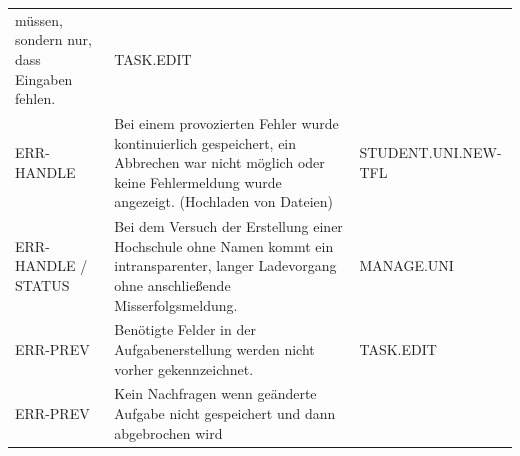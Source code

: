 \documentclass[
  12pt,
  ngerman,
  a4paper,
]{article}
\begin{document}
\begin{longtable}[]{@{}lll@{}}
\begin{minipage}[t]{0.52\columnwidth}
müssen, sondern nur, dass Eingaben fehlen.\strut
\end{minipage} & \begin{minipage}[t]{0.17\columnwidth}\raggedright
TASK.EDIT\strut
\end{minipage}\tabularnewline
\begin{minipage}[t]{0.22\columnwidth}\raggedright
ERR-HANDLE\strut
\end{minipage} & \begin{minipage}[t]{0.52\columnwidth}\raggedright
Bei einem provozierten Fehler wurde kontinuierlich gespeichert, ein
Abbrechen war nicht möglich oder keine Fehlermeldung wurde angezeigt.
(Hochladen von Dateien)\strut
\end{minipage} & \begin{minipage}[t]{0.17\columnwidth}\raggedright
STUDENT.UNI.NEW-TFL\strut
\end{minipage}\tabularnewline
\begin{minipage}[t]{0.22\columnwidth}\raggedright
ERR-HANDLE / STATUS\strut
\end{minipage} & \begin{minipage}[t]{0.52\columnwidth}\raggedright
Bei dem Versuch der Erstellung einer Hochschule ohne Namen kommt ein
intransparenter, langer Ladevorgang ohne anschließende
Misserfolgsmeldung.\strut
\end{minipage} & \begin{minipage}[t]{0.17\columnwidth}\raggedright
MANAGE.UNI\strut
\end{minipage}\tabularnewline
\begin{minipage}[t]{0.22\columnwidth}\raggedright
ERR-PREV\strut
\end{minipage} & \begin{minipage}[t]{0.52\columnwidth}\raggedright
Benötigte Felder in der Aufgabenerstellung werden nicht vorher
gekennzeichnet.\strut
\end{minipage} & \begin{minipage}[t]{0.17\columnwidth}\raggedright
TASK.EDIT\strut
\end{minipage}\tabularnewline
\begin{minipage}[t]{0.22\columnwidth}\raggedright
ERR-PREV\strut
\end{minipage} & \begin{minipage}[t]{0.52\columnwidth}\raggedright
Kein Nachfragen wenn geänderte Aufgabe nicht gespeichert und dann
abgebrochen wird\strut
\end{minipage} & \begin{minipage}[t]{0.17\columnwidth}\raggedright

\end{minipage}
\end{longtable}
\end{document}
